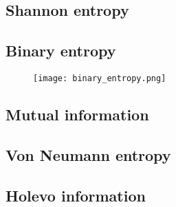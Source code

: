 \subsection{Shannon entropy}
\subsection{Binary entropy}
\begin{figure}
\centering
\texttt{[image: binary\_entropy.png]}
\caption{\label{fig:binary_entropy}}
\end{figure}

\subsection{Mutual information}

\subsection{Von Neumann entropy}
\subsection{Holevo information}






\iffalse
%
%
each received $\rho\left[\phi_{j, m}^{\left(B, C\right)}\right]$ and receives complex phase outcome $x_{B,C}\in\mathbb{C}$. In other words, they perform the POVM
\begin{equation}
E\left[x\right] := \otimes_{j=1}^L E_j\left[x\right] \qq{with} E_j\left[x\right] := \frac{1}{\sqrt{\pi}} \ket{x}_j\bra{x}_j
\end{equation}
with $x \in \mathbb{C}$. 
\fi







